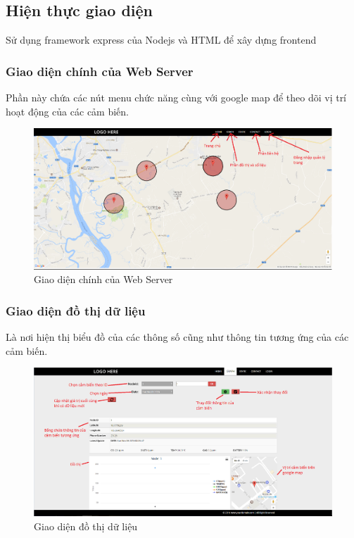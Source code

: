 \subsection{Hiện thực giao diện}

Sử dụng framework express của Nodejs và HTML để xây dựng frontend

\subsubsection*{Giao diện chính của Web Server}
Phần này chứa các nút menu chức năng cùng với google map để theo dõi vị trí hoạt động của các cảm biến.
\begin{center}
\begin{figure}[H]
\centering    
\includegraphics[width=1\textwidth]{webserver}
\caption[Giao diện chính của Web Server]{Giao diện chính của Web Server}
\label{fig:webserver}
\end{figure}
\end{center}

\subsubsection*{Giao diện đồ thị dữ liệu}
Là nơi hiện thị biểu đồ của các thông số cũng như thông tin tương ứng của các cảm biến.
\begin{center}
\begin{figure}[H]
\centering    
\includegraphics[width=1\textwidth]{web_graph}
\caption[Giao diện đồ thị dữ liệu]{Giao diện đồ thị dữ liệu}
\label{fig:web_graph}
\end{figure}
\end{center}



